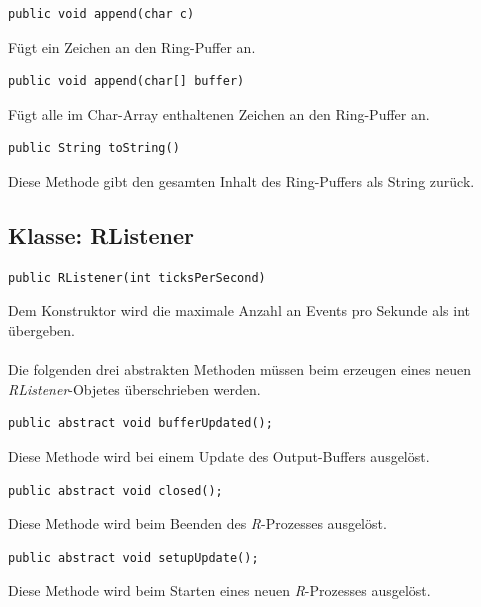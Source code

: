 \documentclass[a4paper, 12pt]{report} %
\begin{document}
\lstset{language=Java}
\begin{lstlisting}[frame=single]
public void append(char c)
\end{lstlisting}
Fügt ein Zeichen an den Ring-Puffer an.\\

\lstset{language=Java}
\begin{lstlisting}[frame=single]
public void append(char[] buffer)
\end{lstlisting}
Fügt alle im Char-Array enthaltenen Zeichen an den Ring-Puffer an.\\

\lstset{language=Java}
\begin{lstlisting}[frame=single]
public String toString()
\end{lstlisting}
Diese Methode gibt den gesamten Inhalt des Ring-Puffers als String zurück.

\subsection{Klasse: RListener}

\lstset{language=Java}
\begin{lstlisting}[frame=single]
public RListener(int ticksPerSecond)
\end{lstlisting}
Dem Konstruktor wird die maximale Anzahl an Events pro Sekunde als int übergeben.\\
\\
Die folgenden drei abstrakten Methoden müssen beim erzeugen eines neuen \textit{RListener}-Objetes überschrieben werden.

\lstset{language=Java}
\begin{lstlisting}[frame=single]
public abstract void bufferUpdated();
\end{lstlisting}
Diese Methode wird bei einem Update des Output-Buffers ausgelöst.\\

\lstset{language=Java}
\begin{lstlisting}[frame=single]
public abstract void closed();
\end{lstlisting}
Diese Methode wird beim Beenden des \textit{R}-Prozesses ausgelöst.\\

\lstset{language=Java}
\begin{lstlisting}[frame=single]
public abstract void setupUpdate();
\end{lstlisting}
Diese Methode wird beim Starten eines neuen \textit{R}-Prozesses ausgelöst.
\end{document}
